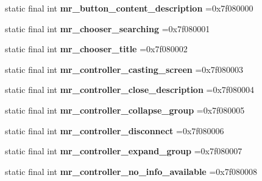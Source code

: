 \begin{DoxyCompactItemize}
\mbox{\label{classproject4_1_1xaria_1_1R_1_1string_a5e5c819afd5e07eee27e92042a3abb43}} 
static final int {\bfseries mr\+\_\+button\+\_\+content\+\_\+description} =0x7f080000
\item 
\mbox{\label{classproject4_1_1xaria_1_1R_1_1string_a02b6b495e646701368f80873cf0278ae}} 
static final int {\bfseries mr\+\_\+chooser\+\_\+searching} =0x7f080001
\item 
\mbox{\label{classproject4_1_1xaria_1_1R_1_1string_aeaaec5cf626e72ba2b178c57e4cb8bc1}} 
static final int {\bfseries mr\+\_\+chooser\+\_\+title} =0x7f080002
\item 
\mbox{\label{classproject4_1_1xaria_1_1R_1_1string_a429c3c95a8620b955c35c6afc500f2f2}} 
static final int {\bfseries mr\+\_\+controller\+\_\+casting\+\_\+screen} =0x7f080003
\item 
\mbox{\label{classproject4_1_1xaria_1_1R_1_1string_a70bf25a9bcf3cfa1b6ad4952ce0f646d}} 
static final int {\bfseries mr\+\_\+controller\+\_\+close\+\_\+description} =0x7f080004
\item 
\mbox{\label{classproject4_1_1xaria_1_1R_1_1string_a266ad49ee9364fb46b5f1ff52a217264}} 
static final int {\bfseries mr\+\_\+controller\+\_\+collapse\+\_\+group} =0x7f080005
\item 
\mbox{\label{classproject4_1_1xaria_1_1R_1_1string_a8c3a5b46b5ae8f2a5696bdcb7faf975f}} 
static final int {\bfseries mr\+\_\+controller\+\_\+disconnect} =0x7f080006
\item 
\mbox{\label{classproject4_1_1xaria_1_1R_1_1string_a654f714a2b241932804f4bf6f736468a}} 
static final int {\bfseries mr\+\_\+controller\+\_\+expand\+\_\+group} =0x7f080007
\item 
\mbox{\label{classproject4_1_1xaria_1_1R_1_1string_a8a4fbb79149bd212934e9e61661ab77b}} 
static final int {\bfseries mr\+\_\+controller\+\_\+no\+\_\+info\+\_\+available} =0x7f080008

\end{DoxyCompactItemize}
